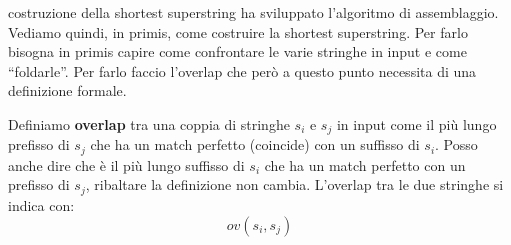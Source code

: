 \documentclass[a4paper,12pt, oneside]{book}
\begin{document}
costruzione della shortest superstring ha sviluppato l'algoritmo di
assemblaggio. Vediamo quindi, in primis, come costruire la shortest
superstring. Per farlo bisogna in primis capire come confrontare le varie
stringhe in input e come ``foldarle''. Per farlo faccio l'overlap che però a
questo punto necessita di una definizione formale.
\begin{definizione}
  Definiamo \textbf{overlap} tra una coppia di stringhe $s_i$ e $s_j$ in input
  come il più lungo prefisso di $s_j$ che ha un match perfetto (coincide) con un
  suffisso di $s_i$. Posso anche dire che è il più lungo suffisso di $s_i$ che
  ha un match perfetto con un prefisso di $s_j$, ribaltare la definizione non
  cambia. L'overlap tra le due stringhe si indica con: 
  \[ov(s_i,s_j)\]
\end{definizione}
\end{document}
